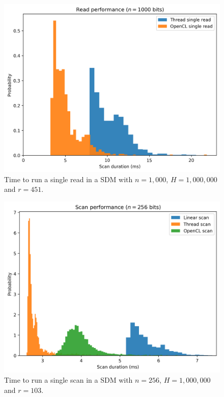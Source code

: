 \begin{figure}[!htb]
\centering\includegraphics[width=\textwidth]{images02/performance/imac-read-1000.png}
\caption{Time to run a single read in a SDM with $n=1,000$, $H=1,000,000$ and $r=451$.
\label{fig:perf-imac-read-1000}}
\end{figure}

\begin{figure}[!htb]
\centering\includegraphics[width=\textwidth]{images02/performance/imac-scans-256.png}
\caption{Time to run a single scan in a SDM with $n=256$, $H=1,000,000$ and $r=103$.
\label{fig:perf-imac-scan-256}}
\end{figure}

